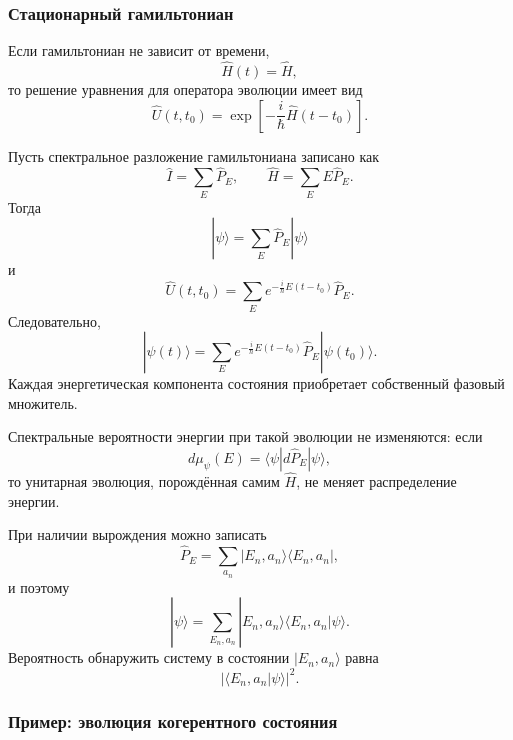 \documentclass[12pt,a4paper]{article}
\begin{document}
\subsubsection{Стационарный гамильтониан}

Если гамильтониан не зависит от времени,
\[
    \hat H(t)=\hat H,
\]
то решение уравнения для оператора эволюции имеет вид
\[
    \boxed{
        \hat U(t,t_0)
        =
        \exp\left[
            -\frac{i}{\hbar}
            \hat H(t-t_0)
        \right]
    }.
\]

Пусть спектральное разложение гамильтониана записано как
\[
    \hat I=\sum_E\hat P_E,
    \qquad
    \hat H=\sum_EE\hat P_E.
\]
Тогда
\[
    |\psi\rangle
    =
    \sum_E\hat P_E|\psi\rangle
\]
и
\[
    \boxed{
        \hat U(t,t_0)
        =
        \sum_E
        e^{-\frac{i}{\hbar}E(t-t_0)}
        \hat P_E
    }.
\]
Следовательно,
\[
    \boxed{
    |\psi(t)\rangle
    =
    \sum_E
        e^{-\frac{i}{\hbar}E(t-t_0)}
        \hat P_E|\psi(t_0)\rangle
    }.
\]
Каждая энергетическая компонента состояния приобретает собственный
фазовый множитель.

Спектральные вероятности энергии при такой эволюции не изменяются:
если
\[
    d\mu_\psi(E)
    =
    \langle\psi|d\hat P_E|\psi\rangle,
\]
то унитарная эволюция, порождённая самим $\hat H$, не меняет
распределение энергии.

При наличии вырождения можно записать
\[
    \hat P_E
    =
    \sum_{a_n}
        |E_n,a_n\rangle
        \langle E_n,a_n|,
\]
и поэтому
\[
    |\psi\rangle
    =
    \sum_{E_n,a_n}
        |E_n,a_n\rangle
        \langle E_n,a_n|\psi\rangle.
\]
Вероятность обнаружить систему в состоянии $|E_n,a_n\rangle$ равна
\[
    \boxed{
        |\langle E_n,a_n|\psi\rangle|^2
    }.
\]


\subsubsection{Пример: эволюция когерентного состояния}
\end{document}
